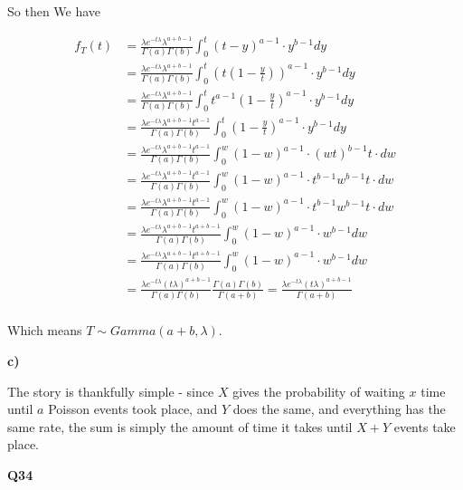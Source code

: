 \documentclass{article}
\begin{document}
			So then We have
			
			\begin{align*}
			 f_T(t) &= \frac{\lambda e^{-t\lambda}\lambda^{a+b-1}}{\Gamma(a)\Gamma(b)}\int^t_0 (t-y)^{a-1} \cdot  y^{b-1} dy\\
			 &= \frac{\lambda e^{-t\lambda}\lambda^{a+b-1}}{\Gamma(a)\Gamma(b)}\int^t_0 \left(t\left(1-\frac{y}{t}\right)\right)^{a-1} \cdot  y^{b-1} dy\\
			 &= \frac{\lambda e^{-t\lambda}\lambda^{a+b-1}}{\Gamma(a)\Gamma(b)}\int^t_0 t^{a-1}\left(1-\frac{y}{t}\right)^{a-1} \cdot  y^{b-1} dy\\
			 &= \frac{\lambda e^{-t\lambda}\lambda^{a+b-1}t^{a-1}}{\Gamma(a)\Gamma(b)}\int^t_0 \left(1-\frac{y}{t}\right)^{a-1} \cdot  y^{b-1} dy\\
			 &= \frac{\lambda e^{-t\lambda}\lambda^{a+b-1}t^{a-1}}{\Gamma(a)\Gamma(b)}\int^w_0 \left(1-w\right)^{a-1} \cdot  \left(wt \right)^{b-1} t\cdot dw\\
			 &= \frac{\lambda e^{-t\lambda}\lambda^{a+b-1}t^{a-1}}{\Gamma(a)\Gamma(b)}\int^w_0 \left(1-w\right)^{a-1} \cdot  t^{b-1}w^{b-1} t\cdot dw\\
			 &= \frac{\lambda e^{-t\lambda}\lambda^{a+b-1}t^{a-1}}{\Gamma(a)\Gamma(b)}\int^w_0 \left(1-w\right)^{a-1} \cdot  t^{b-1}w^{b-1} t\cdot dw\\
			 &= \frac{\lambda e^{-t\lambda}\lambda^{a+b-1}t^{a+b-1}}{\Gamma(a)\Gamma(b)}\int^w_0 \left(1-w\right)^{a-1} \cdot w^{b-1} dw\\
			 &= \frac{\lambda e^{-t\lambda}\lambda^{a+b-1}t^{a+b-1}}{\Gamma(a)\Gamma(b)}\int^w_0 \left(1-w\right)^{a-1} \cdot w^{b-1} dw\\
			 &= \frac{\lambda e^{-t\lambda}(t\lambda)^{a+b-1}}{\Gamma(a)\Gamma(b)}\frac{\Gamma(a)\Gamma(b)}{\Gamma(a+b)} = \frac{\lambda e^{-t\lambda}(t\lambda)^{a+b-1}}{\Gamma(a+b)}\\
			\end{align*}			
			
			Which means $T\sim Gamma(a+b, \lambda)$.
			
			\textbf{c)}
			
			The story is thankfully simple - since $X$ gives the probability of waiting $x$ time until $a$ Poisson events took place, and $Y$ does the same, and everything has the same rate, the sum is simply the amount of time it takes until $X+Y$ events take place.
			
			\hfill
			
		\textbf{Q34}
		
\end{document}
